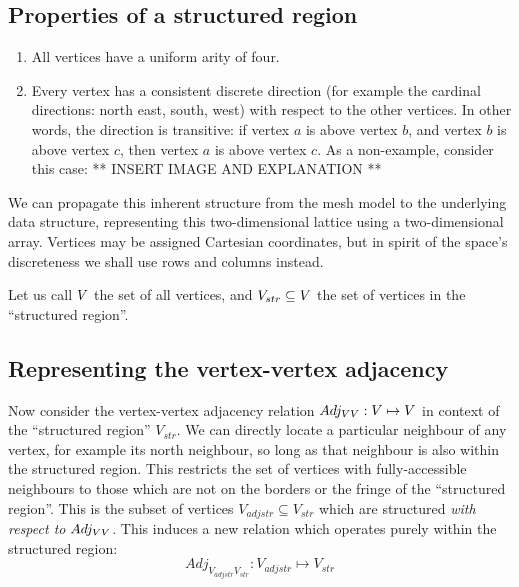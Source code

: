 \subsection{Properties of a structured region}
\label{sec:structured-region-properties}
\begin{enumerate}
\item All vertices have a uniform arity of four.
\item Every vertex has a consistent discrete direction (for example the cardinal directions: north east, south, west) with respect to the other vertices. In other words, the direction is transitive: if vertex $a$ is above vertex $b$, and vertex $b$ is above vertex $c$, then vertex $a$ is above vertex $c$. As a non-example, consider this case:
** INSERT IMAGE AND EXPLANATION **
\end{enumerate}



We can propagate this inherent structure from the mesh model to the underlying data structure, representing this two-dimensional lattice using a two-dimensional array. Vertices may be assigned Cartesian coordinates, but in spirit of the space's discreteness we shall use rows and columns instead.\label{sentence:2d-array}



\newcommand{\strV}{V_{str}}
\newcommand{\adjstrV}{V_{adjstr}}
\newcommand{\AdjVVstr}{Adj_{\adjstrV\strV}}

Let us call $V$ the set of all vertices, and $\strV \subseteq \VertexSet$ the set of vertices in the ``structured region''.

\subsection{Representing the vertex-vertex adjacency}

Now consider the vertex-vertex adjacency relation $Adj_{VV}: V \mapsto V$ in context of the ``structured region'' $\strV$. We can directly locate a particular neighbour of any vertex, for example its north neighbour, so long as that neighbour is also within the structured region. This restricts the set of vertices with fully-accessible neighbours to those which are not on the borders or the fringe of the ``structured region''. This is the subset of vertices $\adjstrV \subseteq \strV$ which are structured \emph{with respect to} $Adj_{VV}$. This induces a new relation which operates purely within the structured region:
$$\AdjVVstr: \adjstrV \mapsto \strV$$

